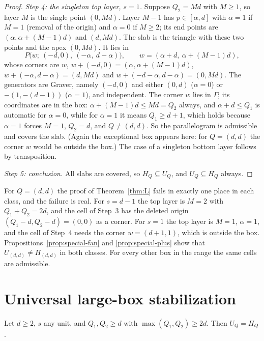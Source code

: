 \begin{proof}
\emph{Step 4: the singleton top layer, $s=1$.} Suppose $Q_2=Md$ with $M\ge1$, so layer $M$ is the single point $(0,Md)$. Layer $M-1$ has $p\in[\alpha,d]$ with $\alpha=1$ if $M=1$ (removal of the origin) and $\alpha=0$ if $M\ge2$; its end points are $(\alpha,\alpha+(M-1)d)$ and $(d,Md)$. The slab is the triangle with these two points and the apex $(0,Md)$. It lies in
\[
  P\bigl(w;\ (-d,0),\ (-\alpha,\ d-\alpha)\bigr),\qquad w=(\alpha+d,\ \alpha+(M-1)d),
\]
whose corners are $w$, $w+(-d,0)=(\alpha,\alpha+(M-1)d)$, $w+(-\alpha,d-\alpha)=(d,Md)$ and $w+(-d-\alpha,d-\alpha)=(0,Md)$. The generators are Graver, namely $(-d,0)$ and either $(0,d)$ ($\alpha=0$) or $-(1,-(d-1))$ ($\alpha=1$), and independent. The corner $w$ lies in $\Gamma$; its coordinates are in the box: $\alpha+(M-1)d\le Md=Q_2$ always, and $\alpha+d\le Q_1$ is automatic for $\alpha=0$, while for $\alpha=1$ it means $Q_1\ge d+1$, which holds because $\alpha=1$ forces $M=1$, $Q_2=d$, and $Q\ne(d,d)$. So the parallelogram is admissible and covers the slab. (Again the exceptional box appears here: for $Q=(d,d)$ the corner $w$ would be outside the box.) The case of a singleton bottom layer follows by transposition.

\emph{Step 5: conclusion.} All slabs are covered, so $H_Q\subseteq U_Q$, and $U_Q\subseteq H_Q$ always.
\end{proof}

\begin{remark}
For $Q=(d,d)$ the proof of Theorem~\ref{thm:L} fails in exactly one place in each class, and the failure is real. For $s=d-1$ the top layer is $M=2$ with $Q_1+Q_2=2d$, and the cell of Step~3 has the deleted origin $(Q_1-d,Q_2-d)=(0,0)$ as a corner. For $s=1$ the top layer is $M=1$, $\alpha=1$, and the cell of Step~4 needs the corner $w=(d+1,1)$, which is outside the box. Propositions~\ref{prop:special-fan} and \ref{prop:special-plus} show that $U_{(d,d)}\ne H_{(d,d)}$ in both classes. For every other box in the range the same cells are admissible.
\end{remark}

\section{Universal large-box stabilization}\label{sec:large}

\begin{theorem}\label{thm:large}
Let $d\ge2$, $s$ any unit, and $Q_1,Q_2\ge d$ with $\max(Q_1,Q_2)\ge2d$. Then $U_Q=H_Q$.
\end{theorem}

